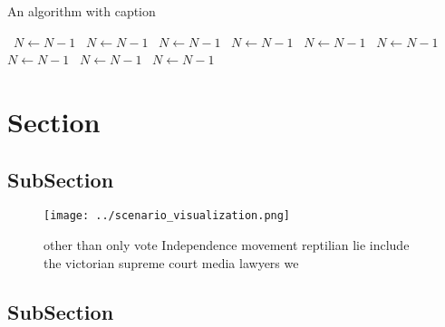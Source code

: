\documentclass[a4paper]{article}
\begin{document}
\begin{algorithm}
\caption{An algorithm with caption}
\begin{algorithmic}
\    \State $N \gets N - 1$
\    \State $N \gets N - 1$
\    \State $N \gets N - 1$
\    \State $N \gets N - 1$
\    \State $N \gets N - 1$
\    \State $N \gets N - 1$
\    \State $N \gets N - 1$
\    \State $N \gets N - 1$
\    \State $N \gets N - 1$
\EndWhile
\end{algorithmic}
\end{algorithm}

\section{Section}

\subsection{SubSection}

\begin{figure}
\centering
\texttt{[image: ../scenario\_visualization.png]}
\caption{other than only vote Independence movement reptilian lie include the victorian supreme court media lawyers we
}
\end{figure}
 
\subsection{SubSection}
\end{document}
